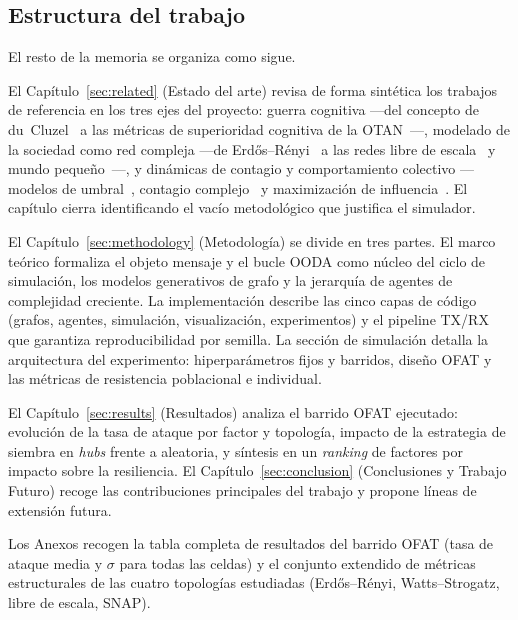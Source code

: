 \documentclass[12pt]{extarticle}
\numberwithin{equation}{section}
\begin{document}
\subsection{Estructura del trabajo}

El resto de la memoria se organiza como sigue.

El Cap\'itulo~\ref{sec:related} (Estado del arte) revisa de forma sint\'etica los trabajos de referencia en los tres ejes del proyecto: guerra cognitiva —del concepto de du~Cluzel~\cite{DuCluzel2021} a las m\'etricas de superioridad cognitiva de la OTAN~\cite{NATOChiefScientist2025,RushingHerschXu2026}—, modelado de la sociedad como red compleja —de Erd\H{o}s--R\'enyi~\cite{ErdosRenyi1960} a las redes libre de escala~\cite{BarabasiAlbert1999} y mundo peque\~no~\cite{WattsStrogatz1998}—, y din\'amicas de contagio y comportamiento colectivo —modelos de umbral~\cite{Granovetter1978,Watts2002}, contagio complejo~\cite{CentolaMacy2007} y maximizaci\'on de influencia~\cite{KempeKleinbergTardos2003}. El cap\'itulo cierra identificando el vac\'io metodol\'ogico que justifica el simulador.

El Cap\'itulo~\ref{sec:methodology} (Metodolog\'ia) se divide en tres partes. El marco te\'orico formaliza el objeto mensaje y el bucle OODA como n\'ucleo del ciclo de simulaci\'on, los modelos generativos de grafo y la jerarqu\'ia de agentes de complejidad creciente. La implementaci\'on describe las cinco capas de c\'odigo (grafos, agentes, simulaci\'on, visualizaci\'on, experimentos) y el pipeline TX/RX que garantiza reproducibilidad por semilla. La secci\'on de simulaci\'on detalla la arquitectura del experimento: hiperpar\'ametros fijos y barridos, dise\~no OFAT y las m\'etricas de resistencia poblacional e individual.

El Cap\'itulo~\ref{sec:results} (Resultados) analiza el barrido OFAT ejecutado: evoluci\'on de la tasa de ataque por factor y topolog\'ia, impacto de la estrategia de siembra en \emph{hubs} frente a aleatoria, y s\'intesis en un \emph{ranking} de factores por impacto sobre la resiliencia. El Cap\'itulo~\ref{sec:conclusion} (Conclusiones y Trabajo Futuro) recoge las contribuciones principales del trabajo y propone l\'ineas de extensi\'on futura.

Los Anexos recogen la tabla completa de resultados del barrido OFAT (tasa de ataque media y $\sigma$ para todas las celdas) y el conjunto extendido de m\'etricas estructurales de las cuatro topolog\'ias estudiadas (Erd\H{o}s--R\'enyi, Watts--Strogatz, libre de escala, SNAP).
\end{document}
